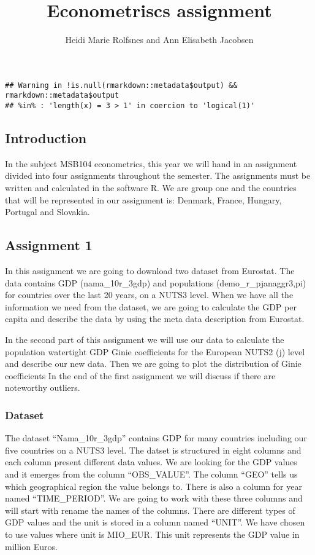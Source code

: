 \documentclass[
]{article}
\title{Econometriscs assignment}
\author{Heidi Marie Rolfsnes and Ann Elisabeth Jacobsen}
\date{}
\begin{document}
\maketitle

\begin{verbatim}
## Warning in !is.null(rmarkdown::metadata$output) && rmarkdown::metadata$output
## %in% : 'length(x) = 3 > 1' in coercion to 'logical(1)'
\end{verbatim}

\hypertarget{introduction}{%
\subsection{Introduction}\label{introduction}}

In the subject MSB104 econometrics, this year we will hand in an
assignment divided into four assignments throughout the semester. The
assignments must be written and calculated in the software R. We are
group one and the countries that will be represented in our assignment
is: Denmark, France, Hungary, Portugal and Slovakia.

\hypertarget{assignment-1}{%
\subsection{Assignment 1}\label{assignment-1}}

In this assignment we are going to download two dataset from Eurostat.
The data contains GDP (nama\_10r\_3gdp) and populations
(demo\_r\_pjanaggr3,pi) for countries over the last 20 years, on a NUTS3
level. When we have all the information we need from the dataset, we are
going to calculate the GDP per capita and describe the data by using the
meta data description from Eurostat.

In the second part of this assignment we will use our data to calculate
the population watertight GDP Ginie coefficients for the European NUTS2
(j) level and describe our new data. Then we are going to plot the
distribution of Ginie coefficients In the end of the first assignment we
will discuss if there are noteworthy outliers.

\hypertarget{dataset}{%
\subsubsection{Dataset}\label{dataset}}

The dataset ``Nama\_10r\_3gdp'' contains GDP for many countries
including our five countries on a NUTS3 level. The datset is structured
in eight columns and each column present different data values. We are
looking for the GDP values and it emerges from the column
``OBS\_VALUE''. The column ``GEO'' tells us which geographical region
the value belongs to. There is also a column for year named
``TIME\_PERIOD''. We are going to work with these three columns and will
start with rename the names of the columns. There are different types of
GDP values and the unit is stored in a column named ``UNIT''. We have
chosen to use values where unit is MIO\_EUR. This unit represents the
GDP value in million Euros.
\end{document}
